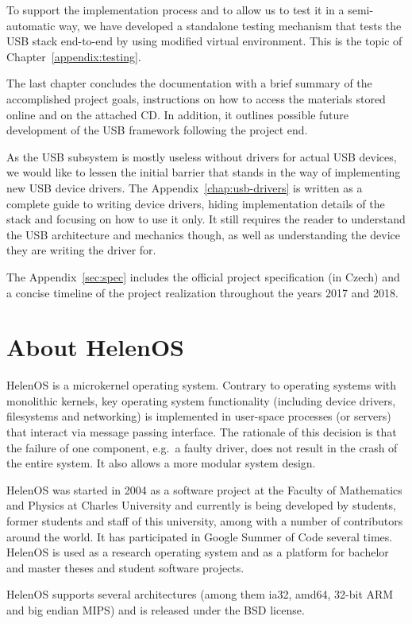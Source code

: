 To support the implementation process and to allow us to test it in
a semi-automatic way, we have developed a standalone testing mechanism that
tests the USB stack end-to-end by using modified virtual environment. This is
the topic of Chapter~\ref{appendix:testing}.

The last chapter concludes the documentation with a brief summary of the
accomplished project goals, instructions on how to access the materials stored
online and on the attached CD. In addition, it outlines possible future
development of the USB framework following the project end.

As the USB subsystem is mostly useless without drivers for actual USB devices,
we would like to lessen the initial barrier that stands in the way of
implementing new USB device drivers. The Appendix~\ref{chap:usb-drivers} is
written as a complete guide to writing device drivers, hiding implementation
details of the stack and focusing on how to use it only. It still requires the
reader to understand the USB architecture and mechanics though, as well as
understanding the device they are writing the driver for.

The Appendix~\ref{sec:spec} includes the official project specification (in
Czech) and a concise timeline of the project realization throughout the years
2017 and 2018.

\section{About HelenOS}
HelenOS is a microkernel operating system. Contrary to operating systems with
monolithic kernels, key operating system functionality (including device
drivers, filesystems and networking) is implemented in user-space processes (or
servers) that interact via message passing interface. The rationale of this
decision is that the failure of one component, e.g.\ a faulty driver, does not
result in the crash of the entire system. It also allows a more modular system
design.

HelenOS was started in 2004 as a software project at the Faculty of Mathematics
and Physics at Charles University and currently is being developed by students,
former students and staff of this university, among with a number of
contributors around the world. It has participated in Google Summer of Code
several times. HelenOS is used as a research operating system and as a platform
for bachelor and master theses and student software projects.

HelenOS supports several architectures (among them ia32, amd64, 32-bit ARM and
big endian MIPS) and is released under the BSD license.

